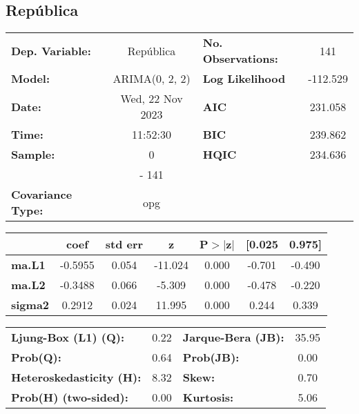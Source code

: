 \documentclass{article}%
\begin{document}
\subsection*{República}%
\begin{center}
\begin{tabular}{lclc}
\toprule
\textbf{Dep. Variable:}          &    República     & \textbf{  No. Observations:  } &    141      \\
\textbf{Model:}                  &  ARIMA(0, 2, 2)  & \textbf{  Log Likelihood     } &  -112.529   \\
\textbf{Date:}                   & Wed, 22 Nov 2023 & \textbf{  AIC                } &  231.058    \\
\textbf{Time:}                   &     11:52:30     & \textbf{  BIC                } &  239.862    \\
\textbf{Sample:}                 &        0         & \textbf{  HQIC               } &  234.636    \\
\textbf{}                        &       - 141      & \textbf{                     } &             \\
\textbf{Covariance Type:}        &       opg        & \textbf{                     } &             \\
\bottomrule
\end{tabular}
\begin{tabular}{lcccccc}
                & \textbf{coef} & \textbf{std err} & \textbf{z} & \textbf{P$> |$z$|$} & \textbf{[0.025} & \textbf{0.975]}  \\
\midrule
\textbf{ma.L1}  &      -0.5955  &        0.054     &   -11.024  &         0.000        &       -0.701    &       -0.490     \\
\textbf{ma.L2}  &      -0.3488  &        0.066     &    -5.309  &         0.000        &       -0.478    &       -0.220     \\
\textbf{sigma2} &       0.2912  &        0.024     &    11.995  &         0.000        &        0.244    &        0.339     \\
\bottomrule
\end{tabular}
\begin{tabular}{lclc}
\textbf{Ljung-Box (L1) (Q):}     & 0.22 & \textbf{  Jarque-Bera (JB):  } & 35.95  \\
\textbf{Prob(Q):}                & 0.64 & \textbf{  Prob(JB):          } &  0.00  \\
\textbf{Heteroskedasticity (H):} & 8.32 & \textbf{  Skew:              } &  0.70  \\
\textbf{Prob(H) (two-sided):}    & 0.00 & \textbf{  Kurtosis:          } &  5.06  \\
\bottomrule
\end{tabular}
\end{center}
\end{document}
